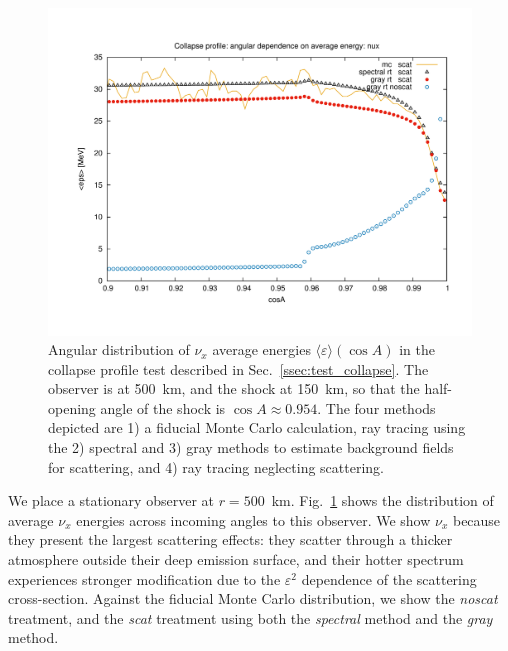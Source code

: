 \documentclass[aps,floatfix,prd,superscriptaddress,twocolumn]{revtex4-1}
\begin{document}
\begin{figure}
  \includegraphics[width=\columnwidth]{fig-collapse_profile_avg_eps_vs_cosA}
  \caption{Angular distribution of $\nu_x$ average energies
    $\langle\varepsilon\rangle(\cos A)$
    in the collapse profile test described in Sec.~\ref{ssec:test_collapse}.
    The observer is at 500~km, and the shock at 150~km,
    so that the half-opening angle of the shock is $\cos A\approx0.954$.
    The four methods depicted are 1) a fiducial Monte Carlo calculation,
    ray tracing using the 2) spectral and 3) gray methods to estimate background
    fields for scattering, and 4) ray tracing neglecting scattering.
  }
  \label{fig:avg_eps_collapse}
\end{figure}

We place a stationary observer at $r=500$~km.
Fig.~\ref{fig:avg_eps_collapse} shows the distribution of average $\nu_x$
energies across incoming angles to this observer.
We show $\nu_x$ because they present the largest scattering effects:
they scatter through a thicker atmosphere outside their deep emission surface,
and their hotter spectrum experiences stronger modification due to the
$\varepsilon^2$ dependence of the scattering cross-section.
Against the fiducial Monte Carlo distribution, we show the
\emph{noscat} treatment, and the \emph{scat} treatment using both the
\emph{spectral} method and the \emph{gray} method.
\end{document}
